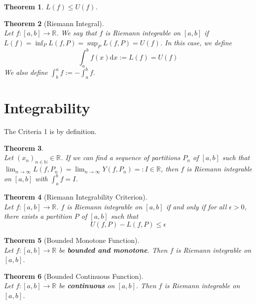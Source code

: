 \documentclass[12pt]{article}
\newcommand{\diff}{\mathrm{d}}
\newtheorem{theorem}{Theorem}[section]
\theoremstyle{definition}
\begin{document}
\begin{theorem}$L(f)\leq U(f)$.\end{theorem}
\begin{theorem}[Riemann Integral]
\hfill\\\normalfont Let $f:[a,b]\to\mathbb{R}$. We say that $f$ is Riemann integrable on $[a,b]$ if $L(f)=\inf_P L(f,P)=\sup_P L(f,P)=U(f)$. In this case, we define
\[
\int_a^b f(x)\diff x:=L(f)=U(f)
\]
We also define $\int_b^a f:=-\int_a^b f$.
\end{theorem}
\section{Integrability}
The Criteria 1 is by definition.
\begin{theorem}
\hfill\\\normalfont Let $(x_n)_{n\in\mathbb{N}}\in \mathbb{R}$. If we can find a sequence of partitions $P_n$ of $[a,b]$ such that $\lim_{n\to\infty}L(f,P_n)=\lim_{n\to\infty}Y(f,P_n)=:I\in\mathbb{R}$, then $f$ is Riemann integrable on $[a,b]$ with $\int_a^b f=I$.
\end{theorem}
\begin{theorem}[Riemann Integrability Criterion]
\hfill\\\normalfont Let $f:[a,b]\to\mathbb{R}$. $f$ is Riemann integrable on $[a,b]$ \textit{if and only if} for all $\epsilon>0$, there exists a partition $P$ of $[a,b]$ such that
\[
U(f,P)-L(f,P)\leq \epsilon
\]
\end{theorem}
\begin{theorem}[Bounded Monotone Function]
\hfill\\\normalfont Let $f:[a,b]\to\mathbb{R}$ be \textbf{bounded and monotone}. Then $f$ is Riemann integrable on $[a,b]$.
\end{theorem}
\begin{theorem}[Bounded Continuous Function]
\hfill\\\normalfont Let $f:[a,b]\to\mathbb{R}$ be \textbf{continuous} on $[a,b]$. Then $f$ is Riemann integrable on $[a,b]$.
\end{theorem}
\clearpage
\end{document}
